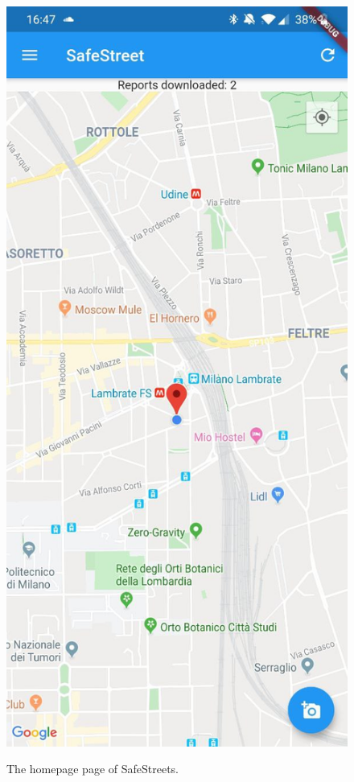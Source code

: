 \documentclass[../RASD.tex]{subfiles}
\begin{document}
    \begin{figure}[H]
        \centering
        \includegraphics[scale = 0.2]{assets/app_screenshots/home.jpg}\\[1.6 cm]
        \caption[\textit{Home Page} Screenshot]{The homepage page of SafeStreets.}
    \end{figure}
\end{document}
